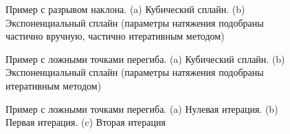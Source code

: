 \begin{figure}[h]
\centering
{}\hfill
{}
\caption{Пример с разрывом наклона. (a) Кубический сплайн. (b) Экспоненциальный сплайн (параметры натяжения подобраны частично вручную, частично итеративным методом)}
\end{figure}

\begin{figure}[h]
\centering
{}\hfill
{}
\caption{Пример с ложными точками перегиба. (a) Кубический сплайн. (b) Экспоненциальный сплайн (параметры натяжения подобраны итеративным методом)}
\end{figure}

\begin{figure}[h]
\centering
{}
\caption{Пример с ложными точками перегиба. (a) Нулевая итерация. (b) Первая итерация. (c) Вторая итерация}
\end{figure}
\FloatBarrier

\pagebreak
